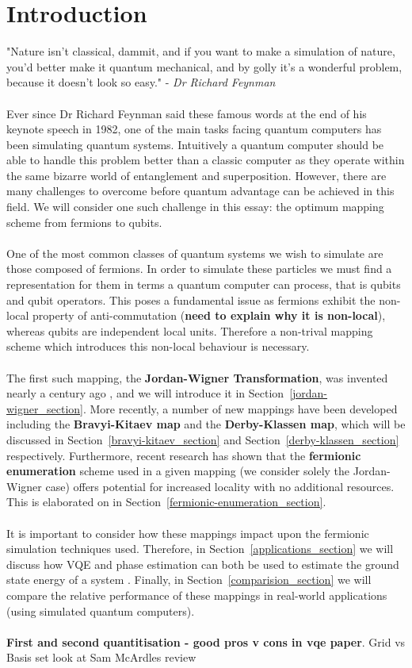 \documentclass[twoside]{article}
\begin{document}
\section{Introduction}
"Nature isn't classical, dammit, and if you want to make a simulation of nature, you'd better make it quantum mechanical, and by golly it's a wonderful problem, because it doesn't look so easy." - \textsl{Dr Richard Feynman} \cite{feynmann} \\\\
Ever since Dr Richard Feynman said these famous words at the end of his keynote speech in 1982, one of the main tasks facing quantum computers has been simulating quantum systems. Intuitively a quantum computer should be able to handle this problem better than a classic computer as they operate within the same bizarre world of entanglement and superposition. However, there are many challenges to overcome before quantum advantage can be achieved in this field. We will consider one such challenge in this essay: the optimum mapping scheme from fermions to qubits.\\\\
One of the most common classes of quantum systems we wish to simulate are those composed of fermions. In order to simulate these particles we must find a representation for them in terms a quantum computer can process, that is qubits and qubit operators. This poses a fundamental issue as fermions exhibit the non-local property of anti-commutation (\textbf{need to explain why it is non-local}), whereas qubits are independent local units. Therefore a non-trival mapping scheme which introduces this non-local behaviour is necessary.\\\\
The first such mapping, the \textbf{Jordan-Wigner Transformation}, was invented nearly a century ago \cite{originalJordanWigner}, and we will introduce it in Section~\ref{jordan-wigner_section}. More recently, a number of new mappings have been developed including the \textbf{Bravyi-Kitaev map} and the \textbf{Derby-Klassen map}, which will be discussed in Section~\ref{bravyi-kitaev_section} and Section~\ref{derby-klassen_section} respectively. Furthermore, recent research \cite{fermionicEncoding} has shown that the \textbf{fermionic enumeration} scheme used in a given mapping (we consider solely the Jordan-Wigner case) offers potential for increased locality with no additional resources. This is elaborated on in Section~\ref{fermionic-enumeration_section}.\\\\
It is important to consider how these mappings impact upon the fermionic simulation techniques used. Therefore, in Section~\ref{applications_section} we will discuss how VQE and phase estimation can both be used to estimate the ground state energy of a system . Finally,  in Section~\ref{comparision_section} we will compare the relative performance of these mappings in real-world applications (using simulated quantum computers).\\\\
\textbf{First and second quantitisation - good pros v cons in vqe paper}. Grid vs Basis set look at Sam McArdles review
\end{document}
